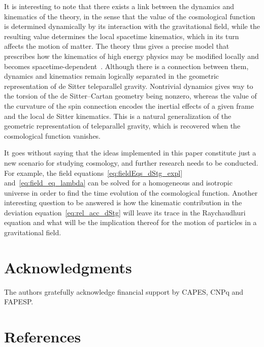 \documentclass[%
5p,
times,
sort&compress
]{elsarticle}
\begin{document}
It is interesting to note that there exists a link between the 
dynamics and kinematics of the theory, in the sense that the 
value of the cosmological function is determined dynamically by 
its interaction with the gravitational field, while the resulting 
value determines the local spacetime kinematics, which in its 
turn affects the motion of matter. The theory thus gives 
a precise model that prescribes how the kinematics of high energy 
physics may be modified locally and becomes 
spacetime-dependent~\cite{Mansouri:2002cg}. Although there is 
a connection between them, dynamics and kinematics remain 
logically separated in the geometric representation of de Sitter 
teleparallel gravity. Nontrivial dynamics gives way to the 
torsion of the de Sitter--Cartan geometry being nonzero, whereas 
the value of the curvature of the spin connection encodes the 
inertial effects of a given frame and the local de Sitter 
kinematics. This is a natural generalization of the geometric 
representation of teleparallel gravity, which is recovered when 
the cosmological function vanishes.

It goes without saying that the ideas implemented in this paper 
constitute just a new scenario for studying cosmology,
and further research needs to be conducted. For example, the 
field equations~\eqref{eq:fieldEqs_dStg_expl} 
and~\eqref{eq:field_eq_lambda} can be solved for a homogeneous 
and isotropic universe in order to find the time evolution of the 
cosmological function. Another interesting question to be 
answered is how the kinematic contribution in the deviation 
equation~\eqref{eq:rel_acc_dStg} will leave its trace in the 
Raychaudhuri equation and what will be the implication thereof 
for the motion of particles in a gravitational field.

\section*{Acknowledgments}

The authors gratefully acknowledge financial support by CAPES, 
CNPq and FAPESP.

\section*{References}



\end{document}
